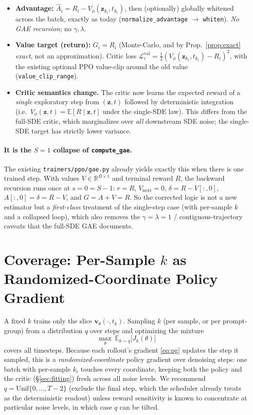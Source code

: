 \documentclass[11pt]{article}
\theoremstyle{plain}
\theoremstyle{remark}
\newcommand{\zt}{\bm{z}}
\newcommand{\E}{\mathbb{E}}
\newcommand{\R}{\mathbb{R}}
\newcommand{\Vphi}{V_\phi}
\begin{document}
\begin{itemize}[leftmargin=1.5em]
  \item \textbf{Advantage:} $\hat A_i = R_i - \Vphi(\zt_{k_i},t_{k_i})$, then (optionally)
  globally whitened across the batch, exactly as today
  (\texttt{normalize\_advantage} $\to$ \texttt{whiten}). \emph{No GAE recursion}; no
  $\gamma,\lambda$.
  \item \textbf{Value target (return):} $G_i = R_i$ (Monte-Carlo, and by
  Prop.~\ref{prop:exact} \emph{exact}, not an approximation). Critic loss
  $\mathcal L^{\text{val}}_i=\tfrac12(\Vphi(\zt_{k_i},t_{k_i})-R_i)^2$, with the existing
  optional PPO value-clip around the old value (\texttt{value\_clip\_range}).
  \item \textbf{Critic semantics change.} The critic now learns the expected reward of a
  \emph{single} exploratory step from $(\zt,t)$ followed by deterministic integration
  (i.e.\ $\Vphi(\zt,t)=\E[R\mid\zt,t]$ under the single-SDE law). This differs from the
  full-SDE critic, which marginalizes over \emph{all} downstream SDE noise; the
  single-SDE target has strictly lower variance.
\end{itemize}

\paragraph{It is the $S{=}1$ collapse of \texttt{compute\_gae}.} The existing
\texttt{trainers/ppo/gae.py} already yields exactly this when there is one trained step.
With values $V\in\R^{B\times1}$ and terminal reward $R$, the backward recursion runs once
at $s=0=S-1$: $r=R$, $V_{\text{next}}=0$, $\delta=R-V[:,0]$, $A[:,0]=\delta=R-V$, and
$G=A+V=R$. So the corrected logic is not a new estimator but a \emph{first-class}
treatment of the single-step case (with per-sample $k$ and a collapsed loop), which also
removes the $\gamma{=}\lambda{=}1$ / contiguous-trajectory caveats that the full-SDE GAE
documents.

\section{Coverage: Per-Sample $k$ as Randomized-Coordinate Policy Gradient}
\label{sec:coverage}

A fixed $k$ trains only the slice $\bm v_\theta(\cdot,t_k)$. Sampling $k$ (per sample, or
per prompt-group) from a distribution $q$ over steps and optimizing the mixture
\begin{equation}
\max_\theta\ \E_{k\sim q}\big[J_k(\theta)\big]
\end{equation}
covers all timesteps. Because each rollout's gradient \eqref{eq:pg} updates the step it
sampled, this is a \emph{randomized-coordinate} policy gradient over denoising steps: one
batch with per-sample $k_i$ touches every coordinate, keeping both the policy and the
critic (\S\ref{sec:fitting}) fresh across all noise levels. We recommend $q=\mathrm{Unif}
\{0,\dots,T-2\}$ (exclude the final step, which the scheduler already treats as the
deterministic readout) unless reward sensitivity is known to concentrate at particular
noise levels, in which case $q$ can be tilted.
\end{document}
